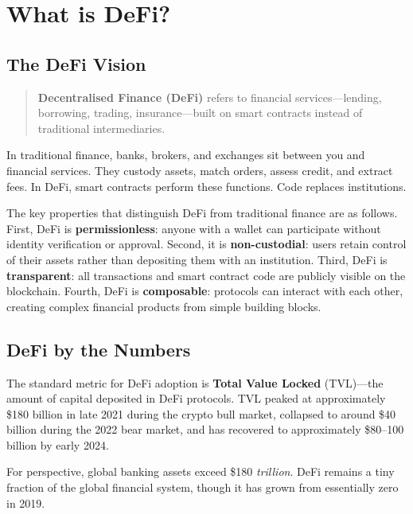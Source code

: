 \documentclass[11pt,a4paper]{article}
\newcommand{\keyword}[1]{\textbf{\textcolor{AccentOrange}{#1}}}
\begin{document}
\section{What is DeFi?}

\subsection{The DeFi Vision}

\begin{quote}
\keyword{Decentralised Finance (DeFi)} refers to financial services---lending, borrowing, trading, insurance---built on smart contracts instead of traditional intermediaries.
\end{quote}

In traditional finance, banks, brokers, and exchanges sit between you and financial services. They custody assets, match orders, assess credit, and extract fees. In DeFi, smart contracts perform these functions. Code replaces institutions.

The key properties that distinguish DeFi from traditional finance are as follows. First, DeFi is \textbf{permissionless}: anyone with a wallet can participate without identity verification or approval. Second, it is \textbf{non-custodial}: users retain control of their assets rather than depositing them with an institution. Third, DeFi is \textbf{transparent}: all transactions and smart contract code are publicly visible on the blockchain. Fourth, DeFi is \textbf{composable}: protocols can interact with each other, creating complex financial products from simple building blocks.

\subsection{DeFi by the Numbers}

The standard metric for DeFi adoption is \keyword{Total Value Locked} (TVL)---the amount of capital deposited in DeFi protocols. TVL peaked at approximately \$180 billion in late 2021 during the crypto bull market, collapsed to around \$40 billion during the 2022 bear market, and has recovered to approximately \$80--100 billion by early 2024.

For perspective, global banking assets exceed \$180 \textit{trillion}. DeFi remains a tiny fraction of the global financial system, though it has grown from essentially zero in 2019.
\end{document}
